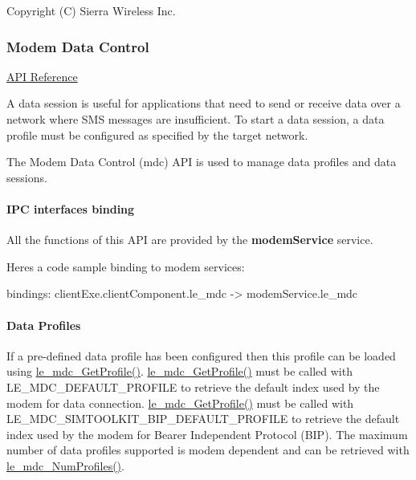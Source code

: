 Copyright (C) Sierra Wireless Inc. \hypertarget{c_mdc}{}\subsubsection{Modem Data Control}\label{c_mdc}
\hyperlink{le__mdc__interface_8h}{A\+PI Reference}





A data session is useful for applications that need to send or receive data over a network where S\+MS messages are insufficient. To start a data session, a data profile must be configured as specified by the target network.

The Modem Data Control (mdc) A\+PI is used to manage data profiles and data sessions.\hypertarget{c_mdc_le_mdc_binding}{}\paragraph{I\+P\+C interfaces binding}\label{c_mdc_le_mdc_binding}
All the functions of this A\+PI are provided by the {\bfseries modem\+Service} service.

Here\textquotesingle{}s a code sample binding to modem services\+: \begin{DoxyVerb}bindings:
{
   clientExe.clientComponent.le_mdc -> modemService.le_mdc
}
\end{DoxyVerb}
\hypertarget{c_mdc_le_mdc_profile}{}\paragraph{Data Profiles}\label{c_mdc_le_mdc_profile}
If a pre-\/defined data profile has been configured then this profile can be loaded using \hyperlink{le__mdc__interface_8h_a638b693cd5f644fa5c24f81e1e36483c}{le\+\_\+mdc\+\_\+\+Get\+Profile()}. \hyperlink{le__mdc__interface_8h_a638b693cd5f644fa5c24f81e1e36483c}{le\+\_\+mdc\+\_\+\+Get\+Profile()} must be called with {\ttfamily L\+E\+\_\+\+M\+D\+C\+\_\+\+D\+E\+F\+A\+U\+L\+T\+\_\+\+P\+R\+O\+F\+I\+LE} to retrieve the default index used by the modem for data connection. \hyperlink{le__mdc__interface_8h_a638b693cd5f644fa5c24f81e1e36483c}{le\+\_\+mdc\+\_\+\+Get\+Profile()} must be called with {\ttfamily L\+E\+\_\+\+M\+D\+C\+\_\+\+S\+I\+M\+T\+O\+O\+L\+K\+I\+T\+\_\+\+B\+I\+P\+\_\+\+D\+E\+F\+A\+U\+L\+T\+\_\+\+P\+R\+O\+F\+I\+LE} to retrieve the default index used by the modem for Bearer Independent Protocol (B\+IP). The maximum number of data profiles supported is modem dependent and can be retrieved with \hyperlink{le__mdc__interface_8h_a790602f1b17d7bf9626a51eac5599439}{le\+\_\+mdc\+\_\+\+Num\+Profiles()}.

